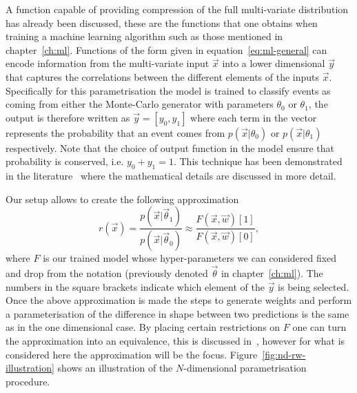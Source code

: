A function capable of providing compression of the full multi-variate
distribution has already been discussed, these are the functions that one
obtains when training a machine learning algorithm such as those mentioned
in chapter~\ref{ch:ml}. Functions of the form given in
equation~\ref{eq:ml-general} can encode information from the multi-variate
input $\vec{x}$ into a lower dimensional $\vec{y}$ that captures the
correlations between the different elements of the inputs $\vec{x}$.
Specifically for this parametrisation the model is trained to classify events as
coming from either the Monte-Carlo generator with parameters $\theta_0$ or
$\theta_1$, the output is therefore written as $\vec{y} = [y_0, y_1]$ where each
term in the vector represents the probability that an event comes from
$p(\vec{x} | \theta_0)$ or $p(\vec{x} | \theta_1)$ respectively. Note that the
choice of output function in the model ensure that probability is conserved,
i.e. $y_0 + y_1 = 1$. This technique has been demonstrated in the
literature~\cite{cranmer2016approximating} where the mathematical details are
discussed in more detail.

Our setup allows to create the following approximation
\begin{equation}
  r(\vec{x}) =  \frac{p(\vec{x}|\vec{\theta}_{1})}{p(\vec{x}|\vec{\theta}_{0})}
  \approx \frac{F(\vec{x}, \vec{w})[1]}{F(\vec{x}, \vec{w})[0]},
  \label{eq:bdtr-approximation}
\end{equation}
where $F$ is our trained model whose hyper-parameters we can considered fixed
and drop from the notation (previously denoted $\vec{\theta}$ in
chapter~\ref{ch:ml}). The numbers in the square brackets indicate which element
of the $\vec{y}$ is being selected. Once the above approximation is made the
steps to generate weights and perform a parameterisation of the difference in
shape between two predictions is the same as in the one dimensional case. By
placing certain restrictions on $F$ one can turn the approximation into an
equivalence, this is discussed in~\cite{modelling-note}, however for what is
considered here the approximation will be the focus.
Figure~\ref{fig:nd-rw-illustration} shows an illustration of the $N$-dimensional
parametrisation procedure.


